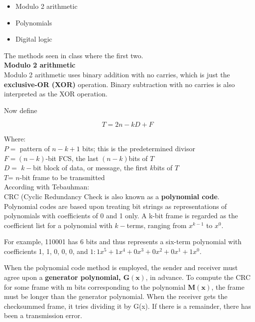 \begin{itemize}
	\item Modulo 2 arithmetic
	\item Polynomials
	\item Digital logic
\end{itemize}

The methods seen in class where the first two.\\


\textbf{Modulo 2 arithmetic}\\

Modulo 2 arithmetic uses binary addition with no carries,
which is just the \textbf{ exclusive-OR (XOR)} operation. Binary subtraction with no carries
is also interpreted as the XOR operation.

Now define

\begin{equation*}
	T = 2n-kD + F
\end{equation*}

Where: \\
$P =$ pattern of $n - k + 1$ bits; this is the predetermined divisor\\
$F = (n - k)$-bit FCS, the last $(n - k) $bits of $T$\\
$D =$ $k-$bit block of data, or message, the first $k $bits of $T$\\
$T$= $n$-bit frame to be transmitted \\

According with Tebauhman:\\

CRC (Cyclic Redundancy Check is  also known
as a \textbf{polynomial code}. Polynomial codes are based upon treating bit strings as
representations of polynomials with coefficients of 0 and 1 only. A k-bit frame is
regarded as the coefficient list for a polynomial with $k-$terms, ranging from $x^{k-1}$
to $x^0$.

For example, 110001 has 6 bits and thus represents a six-term polynomial with
coefficients 1, 1, 0, 0, 0, and $ 1: 1x^5 + 1x^4 + 0x^3 + 0x^2 + 0x^1 + 1x^0.$

When the polynomial code method is employed, the sender and receiver must
agree upon a \textbf{ generator polynomial, $\mathbf{G(x)}$}, in advance.  To compute the CRC for some frame with
m bits corresponding to the polynomial $ \mathbf{M(x)}$, the frame must be longer than the
generator polynomial.  When the receiver gets the checksummed frame, it tries dividing it
by G(x). If there is a remainder, there has been a transmission error.

